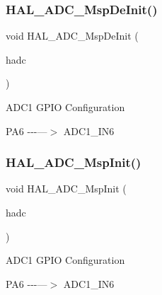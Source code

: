 \subsubsection{\texorpdfstring{HAL\_ADC\_MspDeInit()}{HAL\_ADC\_MspDeInit()}}
{\footnotesize\ttfamily void H\+A\+L\+\_\+\+A\+D\+C\+\_\+\+Msp\+De\+Init (\begin{DoxyParamCaption}\item[{\mbox{\hyperlink{struct_a_d_c___handle_type_def}{A\+D\+C\+\_\+\+Handle\+Type\+Def}} $\ast$}]{hadc }\end{DoxyParamCaption})}

A\+D\+C1 G\+P\+IO Configuration

P\+A6 -\/-\/-\/---$>$ A\+D\+C1\+\_\+\+I\+N6\mbox{\label{group___a_d_c___exported___functions___group1_gaa30863492d5c3103e3e8ce8a63dadd07}} 
\subsubsection{\texorpdfstring{HAL\_ADC\_MspInit()}{HAL\_ADC\_MspInit()}}
{\footnotesize\ttfamily void H\+A\+L\+\_\+\+A\+D\+C\+\_\+\+Msp\+Init (\begin{DoxyParamCaption}\item[{\mbox{\hyperlink{struct_a_d_c___handle_type_def}{A\+D\+C\+\_\+\+Handle\+Type\+Def}} $\ast$}]{hadc }\end{DoxyParamCaption})}

A\+D\+C1 G\+P\+IO Configuration

P\+A6 -\/-\/-\/---$>$ A\+D\+C1\+\_\+\+I\+N6